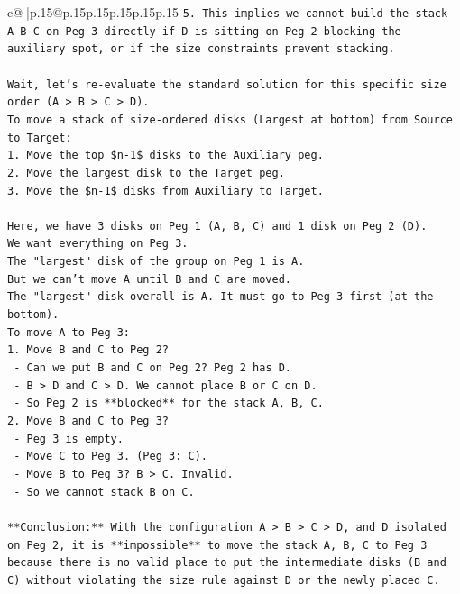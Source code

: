 \documentclass{article}
\begin{document}
{\begin{supertabular}{c@{$\;$}|p{.15\linewidth}@{}p{.15\linewidth}p{.15\linewidth}p{.15\linewidth}p{.15\linewidth}p{.15\linewidth}}
{{{\texttt{5. This implies we cannot build the stack A{-}B{-}C on Peg 3 directly if D is sitting on Peg 2 blocking the auxiliary spot, or if the size constraints prevent stacking.} \\
\\ 
\texttt{Wait, let's re{-}evaluate the standard solution for this specific size order (A > B > C > D).} \\
\texttt{To move a stack of size{-}ordered disks (Largest at bottom) from Source to Target:} \\
\texttt{1. Move the top \$n{-}1\$ disks to the Auxiliary peg.} \\
\texttt{2. Move the largest disk to the Target peg.} \\
\texttt{3. Move the \$n{-}1\$ disks from Auxiliary to Target.} \\
\\ 
\texttt{Here, we have 3 disks on Peg 1 (A, B, C) and 1 disk on Peg 2 (D).} \\
\texttt{We want everything on Peg 3.} \\
\texttt{The "largest" disk of the group on Peg 1 is A.} \\
\texttt{But we can't move A until B and C are moved.} \\
\texttt{The "largest" disk overall is A. It must go to Peg 3 first (at the bottom).} \\
\texttt{To move A to Peg 3:} \\
\texttt{1. Move B and C to Peg 2?} \\
\texttt{   {-} Can we put B and C on Peg 2? Peg 2 has D.} \\
\texttt{   {-} B > D and C > D. We cannot place B or C on D.} \\
\texttt{   {-} So Peg 2 is **blocked** for the stack A, B, C.} \\
\texttt{2. Move B and C to Peg 3?} \\
\texttt{   {-} Peg 3 is empty.} \\
\texttt{   {-} Move C to Peg 3. (Peg 3: C).} \\
\texttt{   {-} Move B to Peg 3? B > C. Invalid.} \\
\texttt{   {-} So we cannot stack B on C.} \\
\\ 
\texttt{**Conclusion:** With the configuration A > B > C > D, and D isolated on Peg 2, it is **impossible** to move the stack A, B, C to Peg 3 because there is no valid place to put the intermediate disks (B and C) without violating the size rule against D or the newly placed C.} \\
}}}
\end{supertabular}}
\end{document}
